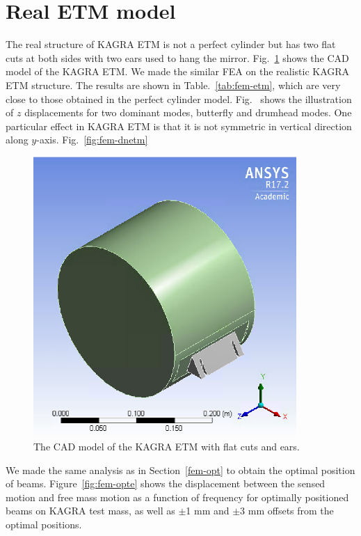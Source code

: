 \section{Real ETM model}

The real structure of KAGRA ETM is not a perfect cylinder but 
has two flat cuts at both sides with two ears used to hang the mirror. 
Fig.~\ref{fig:fem-etm} 
shows the CAD model of the KAGRA ETM. We made the similar FEA on the 
realistic KAGRA ETM structure. The results are shown in 
Table.~\ref{tab:fem-etm}, which are very close to those 
obtained in the perfect cylinder model.
Fig.~\label{fig:fem-etm-mode} shows the illustration of 
$z$ displacements for two dominant modes, butterfly and drumhead modes.
One particular effect in KAGRA ETM is that it is not symmetric in
vertical direction along $y$-axis. Fig.~\ref{fig:fem-dnetm}

\begin{figure}
\begin{center}
\includegraphics[width=10cm]{Figures/fem-etm.eps}
\caption{The CAD model of the KAGRA ETM with flat cuts and ears.}
\label{fig:fem-etm}
\end{center}
\end{figure}

We made the same analysis as in Section~\ref{fem-opt} to obtain 
the optimal position of beams. 
Figure~\ref{fig:fem-opte} shows the displacement between the sensed motion 
and free mass motion as a function of frequency for optimally positioned 
beams on KAGRA test mass, as well as $\pm$1 mm and $\pm$3 mm offsets from 
the optimal positions.


